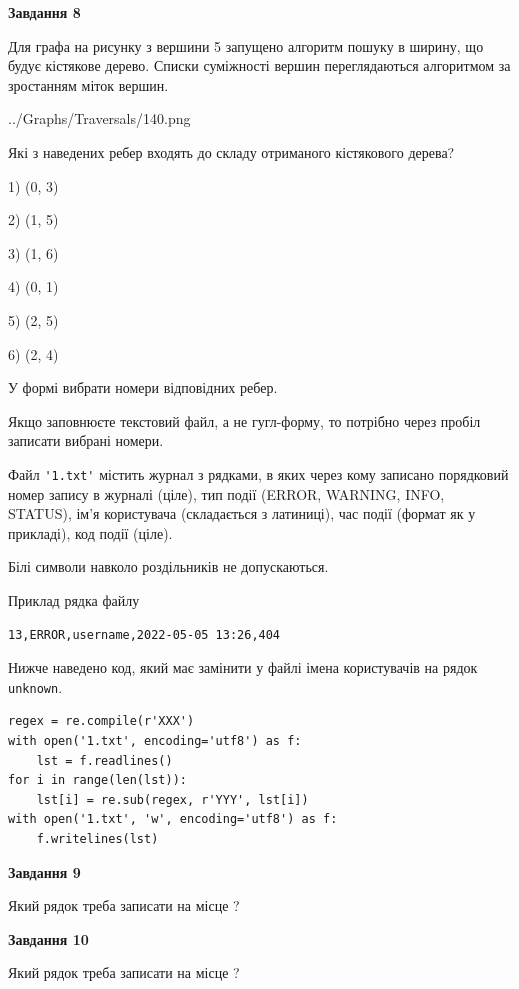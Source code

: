\documentclass[12pt, ukrainian]{article}
\def\code#1{\Verb!#1!}
\begin{document}
{\begin {large}
{\begin {center}\textbf{Завдання 8}\end {center}}\par
Для графа на рисунку з вершини 5 запущено алгоритм пошуку в ширину, що будує кістякове дерево. Списки суміжності вершин переглядаються алгоритмом за зростанням міток вершин.\par
\begin{center}
	{../Graphs/Traversals/140.png}
\end{center}
\par Які з наведених ребер входять до складу отриманого кістякового дерева?\par
1) (0, 3)\par
2) (1, 5)\par
3) (1, 6)\par
4) (0, 1)\par
5) (2, 5)\par
6) (2, 4)\par
{\vskip 15pt} У формі вибрати номери відповідних ребер.


Якщо заповнюєте текстовий файл, а не гугл-форму, то потрібно через пробіл записа\-ти вибрані номери.\par
\newpage


Файл \code{'1.txt'} містить журнал з рядками, в яких через кому записано поряд\-ко\-вий номер запису в журналі (ціле), тип події (ERROR, WARNING, INFO, STATUS), ім'я користувача (складається з латиниці), час події (фор\-мат як у прикладі), код події (ціле).

Білі символи навколо роздільників не допускаються.

Приклад рядка файлу



\begin{verbatim}
13,ERROR,username,2022-05-05 13:26,404
\end{verbatim}


Нижче наведено код, який має замінити у файлі імена користувачів на рядок \code{unknown}.



\begin{verbatim}
regex = re.compile(r'XXX')
with open('1.txt', encoding='utf8') as f:
    lst = f.readlines()
for i in range(len(lst)):
    lst[i] = re.sub(regex, r'YYY', lst[i])
with open('1.txt', 'w', encoding='utf8') as f:
    f.writelines(lst)
\end{verbatim}




{\begin {center}\textbf{Завдання 9}\end {center}}\par
Який рядок треба записати на місце  ?\par
\vspace{5mm}


{\begin {center}\textbf{Завдання 10}\end {center}}\par
Який рядок треба записати на місце  ?\par


\newpage


\end {large}}
\end{document}
